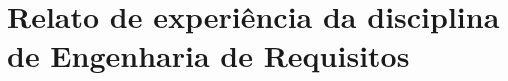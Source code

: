\section[Relato de experiência da disciplina de Engenharia de Requisitos]{Relato de experiência da disciplina de Engenharia de Requisitos}
